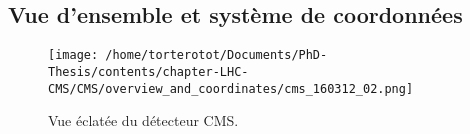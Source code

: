 \subsection{Vue d'ensemble et système de coordonnées}\label{chapter-LHC-section-CMS-subsec-overview_and_coordinates}

\begin{figure}[h]
\centering
\texttt{[image: /home/torterotot/Documents/PhD-Thesis/contents/chapter-LHC-CMS/CMS/overview\_and\_coordinates/cms\_160312\_02.png]}
\caption{Vue éclatée du détecteur CMS.}
\label{fig-chapter-LHC-section-CMS-subsec-overview_and_coordinates-vue_eclatee_CMS}
\end{figure}